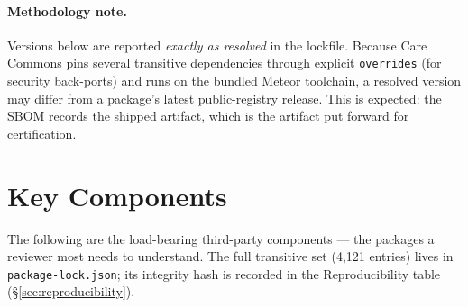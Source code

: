 \paragraph{Methodology note.} Versions below are reported \emph{exactly as
resolved} in the lockfile. Because Care Commons pins several transitive
dependencies through explicit \texttt{overrides} (for security back-ports)
and runs on the bundled Meteor toolchain, a resolved version may differ from
a package's latest public-registry release. This is expected: the SBOM
records the shipped artifact, which is the artifact put forward for
certification.

\section{Key Components}

The following are the load-bearing third-party components --- the packages a
reviewer most needs to understand. The full transitive set (4{,}121 entries)
lives in \texttt{package-lock.json}; its integrity hash is recorded in the
Reproducibility table (\S\ref{sec:reproducibility}).

